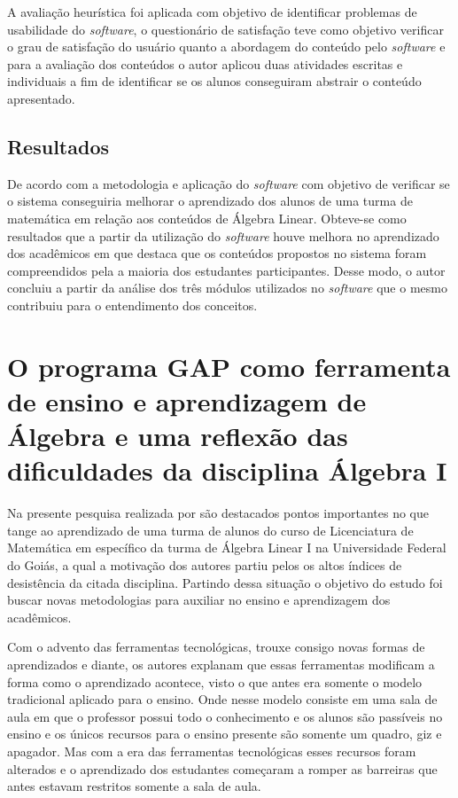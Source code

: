 A avaliação heurística foi aplicada com objetivo de identificar problemas de usabilidade do \textit{software}, o questionário de satisfação teve como objetivo verificar o grau de satisfação do usuário quanto a abordagem do conteúdo pelo \textit{software} e para a avaliação dos conteúdos o autor aplicou duas atividades escritas e individuais a fim de identificar se os alunos conseguiram abstrair o conteúdo apresentado.

\subsection{Resultados}
\noindent De acordo com a metodologia e aplicação do \textit{software} com objetivo de verificar se o sistema conseguiria melhorar o aprendizado dos alunos de uma turma de matemática em relação aos conteúdos de Álgebra Linear. Obteve-se como resultados que a partir da utilização do \textit{software} houve melhora no aprendizado dos acadêmicos em que \cite{2009:Rodrigues} destaca que os conteúdos propostos no sistema foram compreendidos pela a maioria dos estudantes participantes. Desse modo, o autor concluiu a partir da análise dos três módulos utilizados no \textit{software} que o mesmo contribuiu para o entendimento dos conceitos.

\section{O programa GAP como ferramenta de ensino e aprendizagem de Álgebra e uma reflexão das dificuldades da disciplina Álgebra I}  

Na presente pesquisa realizada por \cite{2016:Santos} são destacados pontos importantes no que tange ao aprendizado de uma turma de alunos do curso de Licenciatura de Matemática em específico da turma de Álgebra Linear I na Universidade Federal do Goiás, a qual a motivação dos autores partiu pelos os altos índices de desistência da citada disciplina. Partindo dessa situação o objetivo do estudo foi buscar novas metodologias para auxiliar no ensino e aprendizagem dos acadêmicos.

Com o advento das ferramentas tecnológicas, trouxe consigo novas formas de aprendizados e diante, os autores explanam que essas ferramentas modificam a forma como o aprendizado acontece, visto o que antes era somente o modelo tradicional aplicado para o ensino. Onde nesse modelo consiste em uma sala de aula em que o professor possui todo o conhecimento e os alunos são passíveis no ensino e os únicos recursos para o ensino presente são somente um quadro, giz e apagador. Mas com a era das ferramentas tecnológicas esses recursos foram alterados e o aprendizado dos estudantes começaram a romper as barreiras que antes estavam restritos somente a sala de aula.

